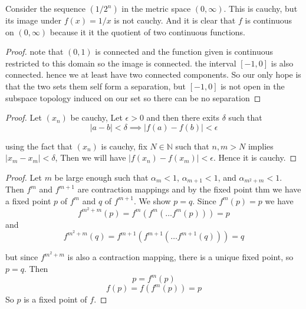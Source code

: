 \documentclass[11pt,largemargins]{homework}
\newcommand{\N}{\mathbb{N}}
\begin{document}
    \question 
    Consider the sequence $(1/2^n)$ in the metric space $(0, \infty)$. This is cauchy, but its image 
    under $f(x) = 1/x$ is not cauchy. And it is clear that $f$ is continuous on $(0, \infty)$ because it 
    it the quotient of two continuous functions.

    \question 
    \begin{proof}
        note that $(0, 1)$ is connected and the function given is continuous restricted to this domain so the image is connected. 
        the interval $[-1, 0]$ is also connected. hence we at least have two connected components. So our only hope is that the two 
        sets them self form a separation, but $[-1,0]$ is not open in the subspace topology induced on our set 
        so there can be no separation

    \end{proof}

    \question
    \begin{proof}
        Let $(x_n)$ be cauchy, Let $\epsilon > 0$ and then there exits $\delta$ such that 
        \[|a - b| < \delta \implies |f(a) - f(b)| < \epsilon\]
        
        using the fact that $(x_n)$ is cauchy, 
        fix $N \in \N$ such that $n, m > N$ implies $|x_m - x_m| < \delta$, 
        Then we will have $|f(x_n) - f(x_m)| < \epsilon$. Hence it is cauchy. 
    \end{proof}


    \question 
    \begin{proof}
        Let $m$ be large enough such that $\alpha_m < 1$, $\alpha_{m+1} < 1$, and $\alpha_{m^2 + m} < 1$. Then $f^m$ and $f^{m+1}$ are contraction mappings and 
        by the fixed point thm we have a fixed point $p$ of $f^m$ and $q$ of $f^{m+1}$. We show $p = q$. 
        Since $f^m(p) = p$ we have 
        \[f^{m^2 + m}(p) = f^m(f^m(\dots f^m(p))) = p \]
        and 
        \[f^{m^2 + m}(q) = f^{m+1}(f^{m+1}(\dots f^{m+1}(q))) = q\]

        but since $f^{m^2+m}$ is also a contraction mapping, there is a unique fixed point, so $p = q$. 
        Then 
        \[p = f^m(p)\]
        \[f(p) = f(f^m(p)) = p\]
        So $p$ is a fixed point of $f$. 
    \end{proof}
\end{document}

